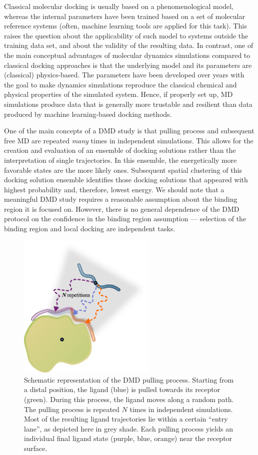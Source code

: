 Classical molecular docking is usually based on a phenomenological model,
whereas the internal parameters have been trained based on a set of molecular
reference systems (often, machine learning tools are applied for this task).
This raises the question about the applicability of such model to systems
outside the training data set, and about the validity of the resulting data. In
contrast, one of the main conceptual advantages of molecular dynamics
simulations compared to classical docking approaches is that the underlying
model and its parameters are (classical) physics-based. The parameters have been
developed over years with the goal to make dynamics simulations reproduce the
classical chemical and physical properties of the simulated system. Hence, if
properly set up, MD simulations produce data that is generally more trustable
and resilient than data produced by machine learning-based docking methods.

One of the main concepts of a DMD study is that pulling process and subsequent
free MD are repeated \textit{many} times in independent simulations. This allows
for the creation and evaluation of an ensemble of docking solutions rather than
the interpretation of single trajectories. In this ensemble, the energetically
more favorable states are the more likely ones. Subsequent spatial clustering of
this docking solution ensemble identifies those docking solutions that appeared
with highest probability and, therefore, lowest energy. We should note that a
meaningful DMD study requires a reasonable assumption about the binding region
it is focused on. However, there is no general dependence of the DMD protocol on
the confidence in the binding region assumption --- selection of the binding
region and local docking are independent tasks.

\begin{figure}
\centering
\includegraphics[height=7cm]{gfx/dmd/scheme_n_repetitions_for_thesis_002.pdf}
\caption[]{Schematic representation of the DMD pulling process. Starting from a
distal position, the ligand (blue) is pulled towards its receptor (green).
During this process, the ligand moves along a random path. The pulling process
is repeated $N$ times in independent simulations. Most of the resulting ligand
trajectories lie within a certain \enquote{entry lane}, as depicted here in grey
shade. Each pulling process yields an individual final ligand state (purple,
blue, orange) near the receptor surface.}
\label{fig:dmd:n_repetitions}
\end{figure}


